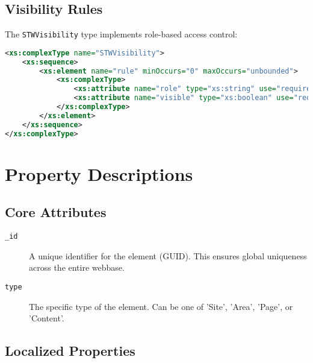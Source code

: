 \subsection{Visibility Rules}

The \texttt{STWVisibility} type implements role-based access control:

\begin{lstlisting}[language=XML,caption={STWVisibility Type Definition}]
<xs:complexType name="STWVisibility">
    <xs:sequence>
        <xs:element name="rule" minOccurs="0" maxOccurs="unbounded">
            <xs:complexType>
                <xs:attribute name="role" type="xs:string" use="required"/>
                <xs:attribute name="visible" type="xs:boolean" use="required"/>
            </xs:complexType>
        </xs:element>
    </xs:sequence>
</xs:complexType>
\end{lstlisting}

\section{Property Descriptions}

\subsection{Core Attributes}

\begin{description}
\item[\texttt{\_id}] A unique identifier for the element (GUID). This ensures global uniqueness across the entire webbase.

\item[\texttt{type}] The specific type of the element. Can be one of 'Site', 'Area', 'Page', or 'Content'.
\end{description}

\subsection{Localized Properties}

